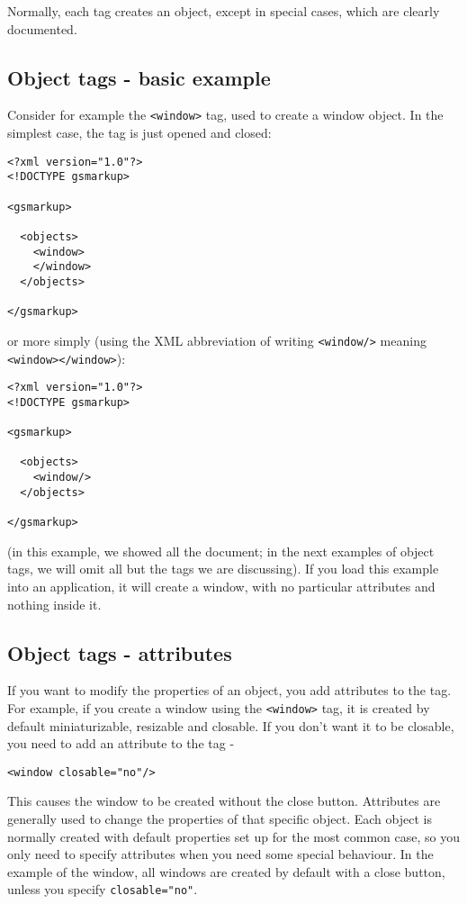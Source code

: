 Normally, each tag creates an object, except in special cases, which
are clearly documented.

\subsection{Object tags - basic example}
Consider for example the \texttt{<window>} tag, used to create a
window object.  In the simplest case, the tag is just opened and
closed:
\begin{verbatim}
<?xml version="1.0"?>
<!DOCTYPE gsmarkup>

<gsmarkup>

  <objects>
    <window>
    </window>
  </objects>

</gsmarkup>
\end{verbatim}
or more simply (using the XML abbreviation of writing
\texttt{<window/>} meaning \texttt{<window></window>}):
\begin{verbatim}
<?xml version="1.0"?> 
<!DOCTYPE gsmarkup>

<gsmarkup>

  <objects>
    <window/>
  </objects>

</gsmarkup>
\end{verbatim}
(in this example, we showed all the document; in the next examples of
object tags, we will omit all but the tags we are discussing).  If you
load this example into an application, it will create a window, with
no particular attributes and nothing inside it.

\subsection{Object tags - attributes}
If you want to modify the properties of an object, you add attributes
to the tag.  For example, if you create a window using the
\texttt{<window>} tag, it is created by default miniaturizable, resizable and 
closable.  If you don't want it to be closable, you need to add an attribute
to the tag -
\begin{verbatim}
<window closable="no"/>
\end{verbatim}
This causes the window to be created without the close button.
Attributes are generally used to change the properties of that
specific object.  Each object is normally created with default
properties set up for the most common case, so you only need to
specify attributes when you need some special behaviour.  In the
example of the window, all windows are created by default with a close
button, unless you specify \texttt{closable="no"}.

